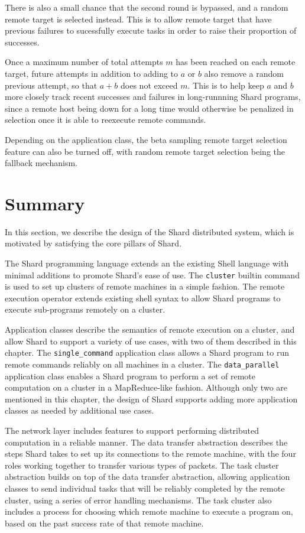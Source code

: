 \documentclass[twoside]{report}
\begin{document}
There is also a small chance that the second round is bypassed, and a random remote target is selected instead.
This is to allow remote target that have previous failures to sucessfully execute tasks in order to raise their proportion of successes.

Once a maximum number of total attempts $m$ has been reached on each remote target, future attempts in addition to adding to $a$ or $b$ also remove a random previous attempt, so that $a+b$ does not exceed $m$.
This is to help keep $a$ and $b$ more closely track recent successes and failures in long-runnning Shard programs, since a remote host being down for a long time would otherwise be penalized in selection once it is able to reexecute remote commands.

Depending on the application class, the beta sampling remote target selection feature can also be turned off, with random remote target selection being the fallback mechanism.

\section{Summary}

In this section, we describe the design of the Shard distributed system, which is motivated by satisfying the core pillars of Shard.

The Shard programming language extends an the existing Shell language with minimal additions to promote Shard's ease of use.
The \texttt{cluster} builtin command is used to set up clusters of remote machines in a simple fashion.
The remote execution operator extends existing shell syntax to allow Shard programs to execute sub-programs remotely on a cluster.

Application classes describe the semantics of remote execution on a cluster, and allow Shard to support a variety of use cases, with two of them described in this chapter.
The \texttt{single\_command} application class allows a Shard program to run remote commands reliably on all machines in a cluster.
The \texttt{data\_parallel} application class enables a Shard program to perform a set of remote computation on a cluster in a MapReduce-like fashion.
Although only two are mentioned in this chapter, the design of Shard supports adding more application classes as needed by additional use cases.

The network layer includes features to support performing distributed computation in a reliable manner.
The data transfer abstraction describes the steps Shard takes to set up its connections to the remote machine, with the four roles working together to transfer various types of packets.
The task cluster abstraction builds on top of the data transfer abstraction, allowing application classes to send individual tasks that will be reliably completed by the remote cluster, using a series of error handling mechanisms.
The task cluster also includes a process for choosing which remote machine to execute a program on, based on the past success rate of that remote machine.
\end{document}
